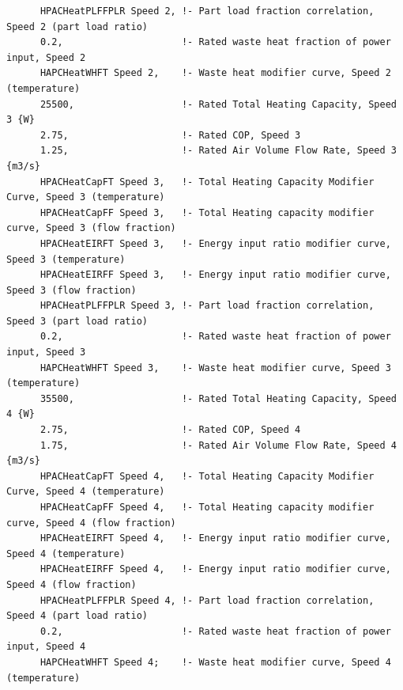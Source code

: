 \begin{lstlisting}
      HPACHeatPLFFPLR Speed 2, !- Part load fraction correlation, Speed 2 (part load ratio)
      0.2,                     !- Rated waste heat fraction of power input, Speed 2
      HAPCHeatWHFT Speed 2,    !- Waste heat modifier curve, Speed 2 (temperature)
      25500,                   !- Rated Total Heating Capacity, Speed 3 {W}
      2.75,                    !- Rated COP, Speed 3
      1.25,                    !- Rated Air Volume Flow Rate, Speed 3 {m3/s}
      HPACHeatCapFT Speed 3,   !- Total Heating Capacity Modifier Curve, Speed 3 (temperature)
      HPACHeatCapFF Speed 3,   !- Total Heating capacity modifier curve, Speed 3 (flow fraction)
      HPACHeatEIRFT Speed 3,   !- Energy input ratio modifier curve, Speed 3 (temperature)
      HPACHeatEIRFF Speed 3,   !- Energy input ratio modifier curve, Speed 3 (flow fraction)
      HPACHeatPLFFPLR Speed 3, !- Part load fraction correlation, Speed 3 (part load ratio)
      0.2,                     !- Rated waste heat fraction of power input, Speed 3
      HAPCHeatWHFT Speed 3,    !- Waste heat modifier curve, Speed 3 (temperature)
      35500,                   !- Rated Total Heating Capacity, Speed 4 {W}
      2.75,                    !- Rated COP, Speed 4
      1.75,                    !- Rated Air Volume Flow Rate, Speed 4 {m3/s}
      HPACHeatCapFT Speed 4,   !- Total Heating Capacity Modifier Curve, Speed 4 (temperature)
      HPACHeatCapFF Speed 4,   !- Total Heating capacity modifier curve, Speed 4 (flow fraction)
      HPACHeatEIRFT Speed 4,   !- Energy input ratio modifier curve, Speed 4 (temperature)
      HPACHeatEIRFF Speed 4,   !- Energy input ratio modifier curve, Speed 4 (flow fraction)
      HPACHeatPLFFPLR Speed 4, !- Part load fraction correlation, Speed 4 (part load ratio)
      0.2,                     !- Rated waste heat fraction of power input, Speed 4
      HAPCHeatWHFT Speed 4;    !- Waste heat modifier curve, Speed 4 (temperature)



\end{lstlisting}
